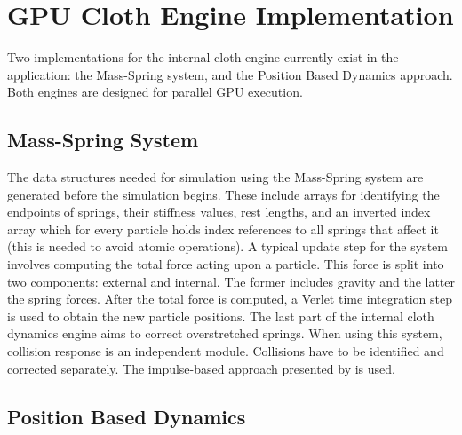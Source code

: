 \section{GPU Cloth Engine Implementation}
\label{sub-sec:gpu-impl}

Two implementations for the internal cloth engine currently exist in the application: the Mass-Spring system, and the Position Based Dynamics approach. Both engines are designed for parallel GPU execution.


\subsection{Mass-Spring System}
\label{sub-sec:mss}

The data structures needed for simulation using the Mass-Spring system are generated before the simulation begins. These include arrays for identifying the endpoints of springs, their stiffness values, rest lengths, and an inverted index array which for every particle holds index references to all springs that affect it (this is needed to avoid atomic operations). A typical update step for the system involves computing the total force acting upon a particle. This force is split into two components: external and internal. The former includes gravity and the latter the spring forces. After the total force is computed, a Verlet time integration step is used to obtain the new particle positions. The last part of the internal cloth dynamics engine aims to correct overstretched springs. When using this system, collision response is an independent module. Collisions have to be identified and corrected separately. The impulse-based approach presented by \citep{bridson02} is used.



\subsection{Position Based Dynamics}
\label{sub-sec:pbdimpl}

